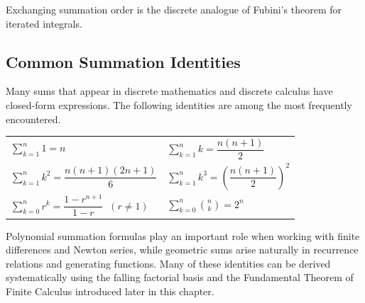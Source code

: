 \begin{remark*}[Interpretation]
Exchanging summation order is the discrete analogue of Fubini's theorem
for iterated integrals.
\end{remark*}

\subsection*{Common Summation Identities}
\label{sec:common-summation-identities}

\begin{remark*}[Interpretation]
Many sums that appear in discrete mathematics and discrete calculus have
closed-form expressions. The following identities are among the most
frequently encountered.
\end{remark*}

\begin{tcolorbox}[colback=gray!6, colframe=gray!40, arc=2pt,
  left=6pt, right=6pt, top=4pt, bottom=4pt,
  title={\small\textbf{Common Summation Identities}},
  fonttitle=\small\bfseries]
\renewcommand{\arraystretch}{1.7}
\begin{tabular}{@{}ll@{}}
$\displaystyle\sum_{k=1}^{n} 1 = n$ &
$\displaystyle\sum_{k=1}^{n} k = \dfrac{n(n+1)}{2}$ \\[10pt]
$\displaystyle\sum_{k=1}^{n} k^2 = \dfrac{n(n+1)(2n+1)}{6}$ &
$\displaystyle\sum_{k=1}^{n} k^3 = \left(\dfrac{n(n+1)}{2}\right)^2$ \\[10pt]
$\displaystyle\sum_{k=0}^{n} r^k = \dfrac{1-r^{n+1}}{1-r}\;\;(r\neq 1)$ &
$\displaystyle\sum_{k=0}^{n}\binom{n}{k} = 2^n$
\end{tabular}
\end{tcolorbox}

\begin{remark*}[Interpretation]
Polynomial summation formulas play an important role when working with
finite differences and Newton series, while geometric sums arise naturally
in recurrence relations and generating functions. Many of these identities
can be derived systematically using the falling factorial basis and
the Fundamental Theorem of Finite Calculus introduced later in this chapter.
\end{remark*}
